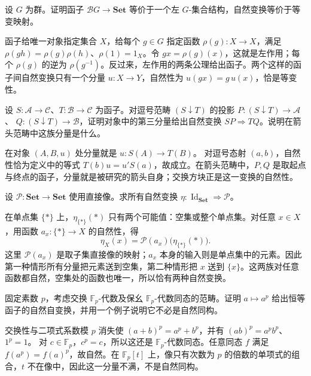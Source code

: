 \begin{exercise}\label{b4:ex:01-actions-as-functors}
	设 \(G\) 为群。证明函子 \(\mathcal BG\rightarrow\mathbf{Set}\) 等价于一个左 \(G\)-集合结构，自然变换等价于等变映射。
\end{exercise}
\begin{solution}
	函子给唯一对象指定集合 \(X\)，给每个 \(g\in G\) 指定函数 \(\rho(g):X\rightarrow X\)，满足 \(\rho(gh)=\rho(g)\rho(h)\)、\(\rho(1)=1_X\)。令 \(gx=\rho(g)(x)\)，这就是左作用；每个 \(\rho(g)\) 的逆为 \(\rho(g^{-1})\)。反过来，左作用的两条公理给出函子。两个这样的函子间自然变换只有一个分量 \(u:X\rightarrow Y\)，自然性为 \(u(gx)=g\,u(x)\)，恰是等变性。
\end{solution}

\begin{exercise}\label{b4:ex:01-comma-tautological-map}
	设 \(S:\mathcal A\to\mathcal C\)、\(T:\mathcal B\to\mathcal C\) 为函子。对逗号范畴 \((S\downarrow T)\) 的投影 \(P:(S\downarrow T)\rightarrow\mathcal A\)、 \(Q:(S\downarrow T)\rightarrow\mathcal B\)，证明对象中的第三分量给出自然变换 \(SP\Rightarrow TQ\)。说明在箭头范畴中这族分量是什么。
\end{exercise}
\begin{solution}
	在对象 \((A,B,u)\) 处分量就是 \(u:S(A)\rightarrow T(B)\)。 对逗号态射 \((a,b)\)，自然性恰为定义中的等式 \(T(b)u=u'S(a)\)，故成立。在箭头范畴中，\(P,Q\) 是取起点与终点的函子，分量就是被研究的箭头自身；交换方块正是这一变换的自然性。
\end{solution}

\begin{exercise}\label{b4:ex:01-natural-subset-choices}
	设 \(\mathcal P:\mathbf{Set}\rightarrow\mathbf{Set}\) 使用直接像。求所有自然变换 \(\eta:\operatorname{Id}_{\mathbf{Set}}\Rightarrow\mathcal P\)。
\end{exercise}
\begin{solution}
	在单点集 \(\{*\}\) 上，\(\eta_{\{*\}}(*)\) 只有两个可能值：空集或整个单点集。对任意 \(x\in X\)，用函数 \(a_x:\{*\}\rightarrow X\) 的自然性，得
	\[
		\eta_X(x)=\mathcal P(a_x)\bigl(\eta_{\{*\}}(*)\bigr).
	\]
	这里 \(\mathcal P(a_x)\) 是取子集直接像的映射；\(a_x\) 本身的输入则是单点集中的元素。因此第一种情形所有分量把元素送到空集，第二种情形把 \(x\) 送到 \(\{x\}\)。这两族对任意函数都自然，空集处的函数也唯一，所以恰有两种自然变换。
\end{solution}

\begin{exercise}\label{b4:ex:01-frobenius-natural}
	固定素数 \(p\)，考虑交换 \(\mathbb F_p\)-代数及保幺 \(\mathbb F_p\)-代数同态的范畴。证明 \(a\mapsto a^p\) 给出恒等函子的自然自变换，并用一个例子说明它不必是自然同构。
\end{exercise}
\begin{solution}
	交换性与二项式系数模 \(p\) 消失使 \((a+b)^p=a^p+b^p\)，并有 \((ab)^p=a^pb^p\)、\(1^p=1\)。 对 \(c\in\mathbb F_p\)，\(c^p=c\)，所以这还是 \(\mathbb F_p\)-代数同态。任意同态 \(f\) 满足 \(f(a^p)=f(a)^p\)，故自然。在 \(\mathbb F_p[t]\) 上，像只有次数为 \(p\) 的倍数的单项式的组合，\(t\) 不在像中，因此这一分量不满，不是自然同构。
\end{solution}

